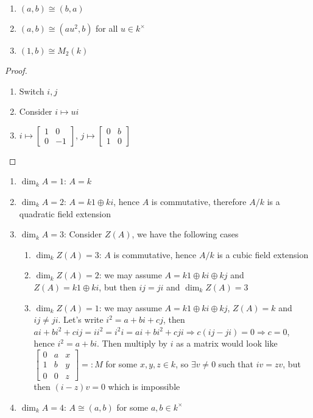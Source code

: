 \documentclass[a4paper,10pt]{article}
\begin{document}
\begin{lemma}
\begin{enumerate}
\item $(a,b)\cong(b,a)$
\item $(a,b)\cong(au^2,b)$ for all $u\in k^\times$
\item $(1,b)\cong M_2(k)$
\end{enumerate}
\end{lemma}

\begin{proof}
\begin{enumerate}
\item Switch $i,j$
\item Consider $i\mapsto ui$
\item $i\mapsto\begin{bmatrix}1&0\\0&-1\end{bmatrix}$, $j\mapsto\begin{bmatrix}0&b\\1&0\end{bmatrix}$
\end{enumerate}
\end{proof}

\begin{proposition}
\begin{enumerate}
\item $\dim_kA=1$: $A=k$
\item $\dim_kA=2$: $A=k1\oplus ki$, hence $A$ is commutative, therefore $A/k$ is a quadratic field extension
\item $\dim_kA=3$: Consider $Z(A)$, we have the following cases
\begin{enumerate}
\item $\dim_kZ(A)=3$: $A$ is commutative, hence $A/k$ is a cubic field extension
\item $\dim_kZ(A)=2$: we may assume $A=k1\oplus ki\oplus kj$ and $Z(A)=k1\oplus ki$, but then $ij=ji$ and $\dim_kZ(A)=3$
\item $\dim_kZ(A)=1$: we may assume $A=k1\oplus ki\oplus kj$, $Z(A)=k$ and $ij\neq ji$. Let's write $i^2=a+bi+cj$, then $ai+bi^2+cij=ii^2=i^2i=ai+bi^2+cji\Rightarrow c(ij-ji)=0\Rightarrow c=0$, hence $i^2=a+bi$. Then multiply by $i$ as a matrix would look like $\begin{bmatrix}0&a&x\\1&b&y\\0&0&z\end{bmatrix}=:M$ for some $x,y,z\in k$, so $\exists v\neq0$ such that $iv=zv$, but then $(i-z)v=0$ which is impossible
\end{enumerate}
\item $\dim_kA=4$: $A\cong(a,b)$ for some $a,b\in k^\times$
\end{enumerate}
\end{proposition}
\end{document}
